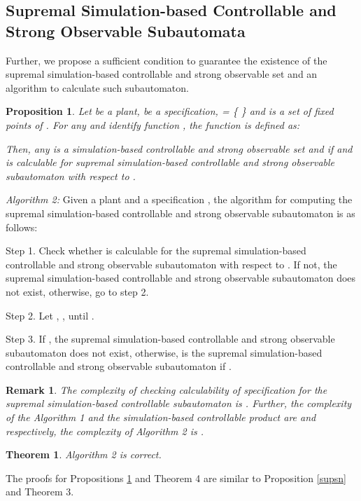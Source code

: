 \documentclass[12pt,draftcls,onecolumn]{IEEEtran}
\newtheorem{Theorem}{Theorem}
\newtheorem{Proposition}{Proposition}
\newtheorem{Remark}{Remark}
\begin{document}
\subsection{Supremal Simulation-based Controllable and Strong Observable Subautomata}
Further, we propose a sufficient condition to guarantee the
existence of the supremal simulation-based controllable and strong
observable set and an algorithm to calculate such subautomaton.
\begin{Proposition}\label{supscn}
Let  be a plant,  be a specification,  = \{  \} and  is a set of
fixed points of . For any 
and identify function , the
function  is
defined as:

Then, any  is a simulation-based
controllable and strong observable set and  if
 and  is calculable for supremal
simulation-based controllable and strong observable subautomaton
with respect to .
\end{Proposition}


{\it Algorithm 2:}  Given a plant 
and a specification , the
algorithm for computing the supremal simulation-based controllable
and strong observable subautomaton is as follows:

Step 1. Check whether  is calculable for the supremal
simulation-based controllable and strong observable subautomaton
with respect to . If not, the supremal simulation-based
controllable and strong observable subautomaton does not exist,
otherwise, go to step 2.

Step 2. Let , ,  until .

Step 3. If , the supremal simulation-based
controllable and strong observable subautomaton does not exist,
otherwise,  is the supremal simulation-based controllable
and strong observable subautomaton if .



\begin{Remark}
The complexity of checking calculability of specification  for
the supremal simulation-based controllable subautomaton is
. Further,
the complexity of the Algorithm 1 and the simulation-based
controllable product are  and 
respectively, the complexity of Algorithm 2 is .
\end{Remark}



\begin{Theorem}
Algorithm 2 is correct.
\end{Theorem}

The proofs for Propositions \ref{supscn} and Theorem 4 are similar
to Proposition \ref{supsn} and Theorem 3.
\end{document}
